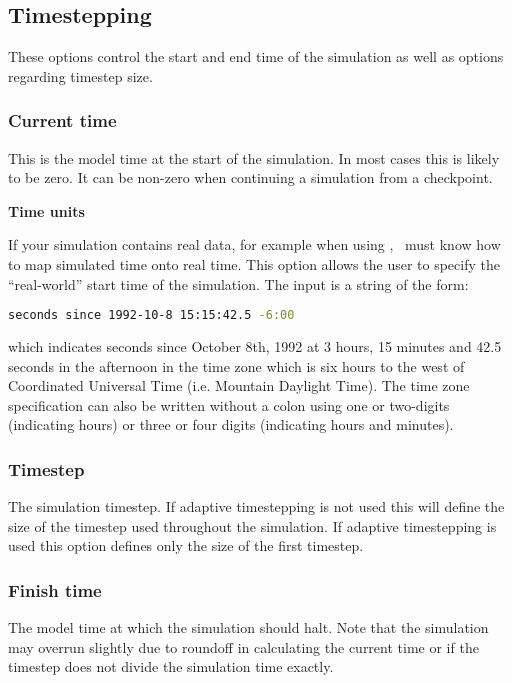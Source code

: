 \subsection{Timestepping}
These options control the start and end time of the simulation as well as options regarding timestep size.

\subsubsection{Current time}
This is the model time at the start of the simulation. In most cases this is likely to be zero. It can be non-zero when continuing a simulation from a checkpoint.

\textbf{Time units}

If your simulation contains real data, for example when using
, \fluidity\ must know how to map simulated time onto
real time. This option allows the user to specify the ``real-world'' start
time of the simulation.  The input is a string of the form:
\begin{lstlisting}[language=bash]
seconds since 1992-10-8 15:15:42.5 -6:00 
\end{lstlisting} 

which indicates seconds since October 8th, 1992 at 3 hours, 15 minutes and
42.5 seconds in the afternoon in the time zone which is six hours to the
west of Coordinated Universal Time (i.e. Mountain Daylight Time). The time
zone specification can also be written without a colon using one or
two-digits (indicating hours) or three or four digits (indicating hours and
minutes).


\subsubsection{Timestep}
The simulation timestep. If adaptive timestepping is not used this will
define the size of the timestep used throughout the simulation.  If adaptive
timestepping is used this option defines only the size of the first
timestep.

\subsubsection{Finish time}
The model time at which the simulation should halt. Note that the simulation
may overrun slightly due to roundoff in calculating the current time or if
the timestep does not divide the simulation time exactly.


